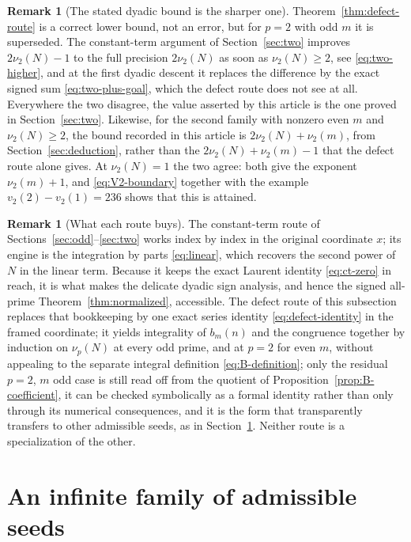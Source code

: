 \documentclass[11pt,letterpaper]{article}
\numberwithin{equation}{section}
\theoremstyle{definition}
\newtheorem{remark}[theorem]{Remark}
\begin{document}
\begin{remark}[The stated dyadic bound is the sharper one]\label{rem:which-bound}
Theorem~\ref{thm:defect-route} is a correct lower bound, not an error,
but for $p=2$ with odd $m$ it is superseded. The constant-term argument
of Section~\ref{sec:two} improves $2\nu_2(N)-1$ to the full precision
$2\nu_2(N)$ as soon as $\nu_2(N)\geq2$, see \eqref{eq:two-higher}, and at
the first dyadic descent it replaces the difference by the exact signed
sum \eqref{eq:two-plus-goal}, which the defect route does not see at all.
Everywhere the two disagree, the value asserted by this article is the
one proved in Section~\ref{sec:two}. Likewise, for the second family with
nonzero even $m$ and $\nu_2(N)\geq2$, the bound recorded in this article
is $2\nu_2(N)+\nu_2(m)$, from Section~\ref{sec:deduction}, rather than
the $2\nu_2(N)+\nu_2(m)-1$ that the defect route alone gives. At
$\nu_2(N)=1$ the two agree: both give the exponent $\nu_2(m)+1$, and
\eqref{eq:V2-boundary} together with the example
$v_2(2)-v_2(1)=236$ shows that this is attained.
\end{remark}

\begin{remark}[What each route buys]
The constant-term route of Sections~\ref{sec:odd}--\ref{sec:two} works
index by index in the original coordinate $x$; its engine is the
integration by parts \eqref{eq:linear}, which recovers the second power of
$N$ in the linear term. Because it keeps the exact Laurent identity
\eqref{eq:ct-zero} in reach, it is what makes the delicate dyadic sign
analysis, and hence the signed all-prime Theorem~\ref{thm:normalized},
accessible. The defect route of this subsection replaces that bookkeeping
by one exact series identity \eqref{eq:defect-identity} in the framed
coordinate; it yields integrality of $b_m(n)$ and the congruence together
by induction on $\nu_p(N)$ at every odd prime, and at $p=2$ for even $m$,
without appealing to the separate integral definition
\eqref{eq:B-definition}; only the residual $p=2$, $m$ odd case is still
read off from the quotient of Proposition~\ref{prop:B-coefficient}, it can be checked symbolically as a formal
identity rather than only through its numerical consequences, and it is
the form that transparently transfers to other admissible seeds, as in
Section~\ref{sec:seeds}. Neither route is a specialization of the other.
\end{remark}

\section{An infinite family of admissible seeds}\label{sec:seeds}
\end{document}

